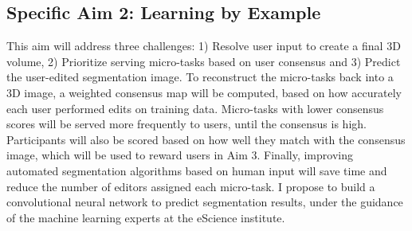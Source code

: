 
\subsection*{Specific Aim 2: Learning by Example}
This aim will address three challenges: 1) Resolve user input to create a final 3D volume, 2) Prioritize serving micro-tasks based on user consensus and 3) Predict the user-edited segmentation image. To reconstruct the micro-tasks back into a 3D image, a weighted consensus map will be computed, based on how accurately each user performed edits on training data. Micro-tasks with lower consensus scores will be served more frequently to users, until the consensus is high. Participants will also be scored based on how well they match with the consensus image, which will be used to reward users in Aim 3. Finally, improving automated segmentation algorithms based on human input will save time and reduce the number of editors assigned each micro-task. I propose to build a convolutional neural network to predict segmentation results, under the guidance of the machine learning experts at the eScience institute. 

